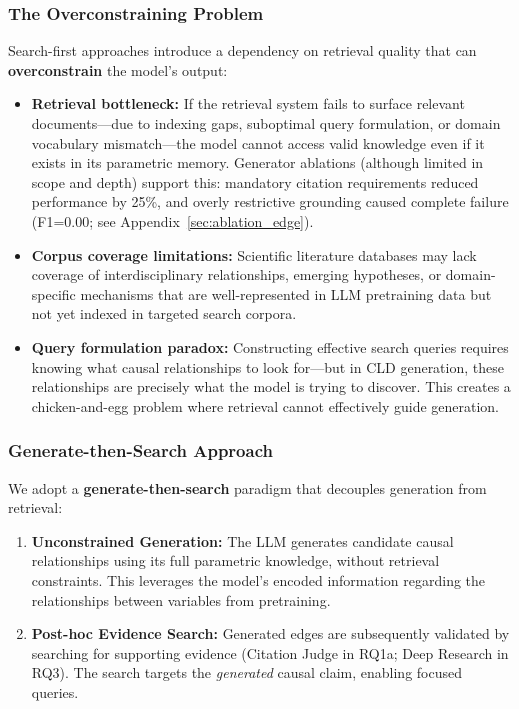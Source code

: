\subsubsection{The Overconstraining Problem}

Search-first approaches introduce a dependency on retrieval quality that can \textbf{overconstrain} the model's output:

\begin{itemize}[noitemsep]
    \item \textbf{Retrieval bottleneck:} If the retrieval system fails to surface relevant documents---due to indexing gaps, suboptimal query formulation, or domain vocabulary mismatch---the model cannot access valid knowledge even if it exists in its parametric memory. Generator ablations (although limited in scope and depth) support this: mandatory citation requirements reduced performance by 25\%, and overly restrictive grounding caused complete failure (F1=0.00; see Appendix~\ref{sec:ablation_edge}).
    \item \textbf{Corpus coverage limitations:} Scientific literature databases may lack coverage of interdisciplinary relationships, emerging hypotheses, or domain-specific mechanisms that are well-represented in LLM pretraining data but not yet indexed in targeted search corpora.
    \item \textbf{Query formulation paradox:} Constructing effective search queries requires knowing what causal relationships to look for---but in CLD generation, these relationships are precisely what the model is trying to discover. This creates a chicken-and-egg problem where retrieval cannot effectively guide generation.
\end{itemize}

\subsubsection{Generate-then-Search Approach}

We adopt a \textbf{generate-then-search} paradigm that decouples generation from retrieval:

\begin{enumerate}[noitemsep]
    \item \textbf{Unconstrained Generation:} The LLM generates candidate causal relationships using its full parametric knowledge, without retrieval constraints. This leverages the model's encoded information regarding the relationships between variables from pretraining.
    \item \textbf{Post-hoc Evidence Search:} Generated edges are subsequently validated by searching for supporting evidence (Citation Judge in RQ1a; Deep Research in RQ3). The search targets the \textit{generated} causal claim, enabling focused queries.
\end{enumerate}

